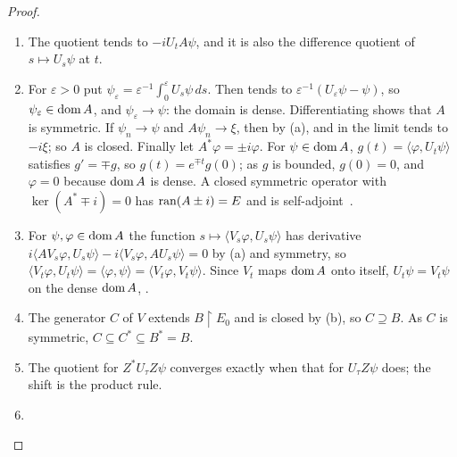 \begin{vetqenv}
\begin{proof}
\begin{enumerate}
\item[(a)] The quotient  tends to $-iU_tA\psi$, and it is also the difference
quotient of $s\mapsto U_s\psi$ at $t$.
\item[(b)] For $\varepsilon>0$ put $\psi_\varepsilon=\varepsilon^{-1}\int_0^\varepsilon U_s\psi\,ds$. Then
 tends to
$\varepsilon^{-1}(U_\varepsilon\psi-\psi)$, so $\psi_\varepsilon\in\operatorname{dom} A$, and $\psi_\varepsilon\to\psi$: the domain is dense. Differentiating
 shows that $A$ is symmetric. If $\psi_n\to\psi$ and $A\psi_n\to\xi$, then
 by (a), and in the limit  tends to $-i\xi$; so $A$ is closed. Finally let $A^*\varphi=\pm i\varphi$. For $\psi\in\operatorname{dom} A$, $g(t)=\langle\varphi,U_t\psi\rangle$ satisfies
$g'=\mp g$, so $g(t)=e^{\mp t}g(0)$; as $g$ is bounded, $g(0)=0$, and $\varphi=0$ because $\operatorname{dom} A$ is dense. A closed symmetric
operator with $\ker(A^*\mp i)=0$ has $\operatorname{ran}(A\pm i)=E$ and is self-adjoint~\cite{rs1}.
\item[(c)] For $\psi,\varphi\in\operatorname{dom} A$ the function $s\mapsto\langle V_s\varphi,U_s\psi\rangle$ has derivative $i\langle AV_s\varphi,U_s\psi\rangle
-i\langle V_s\varphi,AU_s\psi\rangle=0$ by (a) and symmetry, so $\langle V_t\varphi,U_t\psi\rangle=\langle\varphi,\psi\rangle=\langle V_t\varphi,V_t\psi\rangle$.
Since $V_t$ maps $\operatorname{dom} A$ onto itself, $U_t\psi=V_t\psi$ on the dense $\operatorname{dom} A$, .
\item[(d)] The generator $C$ of $V$ extends $B\restriction E_0$ and is closed by (b), so $C\supseteq B$. As $C$ is symmetric,
$C\subseteq C^*\subseteq B^*=B$.
\item[(e)] The quotient for $Z^*U_\tau Z\psi$ converges exactly when that for $U_\tau Z\psi$ does; the shift is the product rule.
\item[(f)] \qedhere
\end{enumerate}
\end{proof}


\end{vetqenv}
